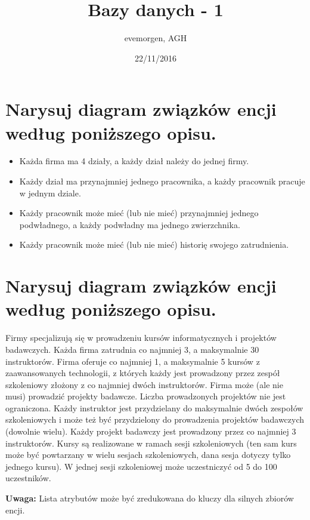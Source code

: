 \documentclass[a4paper,11pt]{article}
\begin{document}
\title{Bazy danych - 1}
\author{evemorgen, AGH}
\date{22/11/2016}
\maketitle

\section{Narysuj diagram związków encji według poniższego opisu.}
\begin{itemize}
	\item Każda firma ma 4 działy, a każdy dział należy do jednej firmy.
	\item Każdy dział ma przynajmniej jednego pracownika, a każdy pracownik pracuje w jednym dziale.
	\item Każdy pracownik może mieć (lub nie mieć) przynajmniej jednego podwładnego, a każdy podwładny ma jednego zwierzchnika.
	\item Każdy pracownik może mieć (lub nie mieć) historię swojego zatrudnienia.
\end{itemize}



\newpage
\section{Narysuj diagram związków encji według poniższego opisu.}
Firmy specjalizują się w prowadzeniu kursów informatycznych i projektów badawczych. Każda firma zatrudnia co najmniej 3, a maksymalnie 30 instruktorów. Firma oferuje co najmniej 1, a maksymalnie 5 kursów z zaawansowanych technologii, z których każdy jest prowadzony przez zespół szkoleniowy złożony z co najmniej dwóch instruktorów. Firma może (ale nie musi) prowadzić projekty badawcze. Liczba prowadzonych projektów nie jest ograniczona. Każdy instruktor jest przydzielany do maksymalnie dwóch zespołów szkoleniowych i może też być przydzielony do prowadzenia projektów badawczych (dowolnie wielu). Każdy projekt badawczy jest prowadzony przez co najmniej 3 instruktorów. Kursy są realizowane w ramach sesji szkoleniowych (ten sam kurs może być powtarzany w wielu sesjach szkoleniowych, dana sesja dotyczy tylko jednego kursu). W jednej sesji szkoleniowej może uczestniczyć od 5 do 100 uczestników.

\vspace{5mm}

\textbf{Uwaga:} Lista atrybutów może być zredukowana do kluczy dla silnych zbiorów encji.
\end{document}
